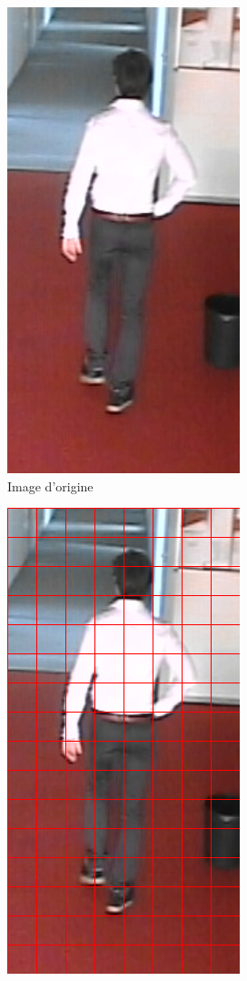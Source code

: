 \documentclass[12pt]{article}
\begin{document}
\begin{figure}[!ht]
\centering
\begin{subfigure}{.3\textwidth}
  \centering
  \includegraphics[width=.5\linewidth]{img/person.png}
  \caption{Image d'origine}
  \label{fig:person}
\end{subfigure}%
\begin{subfigure}{.3\textwidth}
  \centering
  \includegraphics[width=.5\linewidth]{img/cell.png}

\end{subfigure}
\end{figure}
\end{document}
